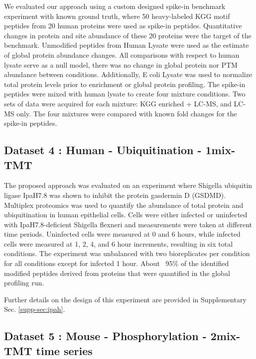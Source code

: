 \documentclass[mcp]{article}
\numberwithin{figure}{section} %
\numberwithin{table}{section}
\begin{document}
We evaluated our approach using a custom designed spike-in benchmark experiment with known ground truth, where 50 heavy-labeled KGG motif peptides from 20 human proteins were used as spike-in peptides. Quantitative changes in protein and site abundance of these 20 proteins were the target of the benchmark.  Unmodified peptides from Human Lysate were used as the estimate of global protein abundance changes. All comparisons with respect to human lysate serve as a null model, there was no change in global protein nor PTM abundance between conditions. Additionally, E coli Lysate was used to normalize total protein levels prior to enrichment or global protein profiling. The spike-in peptides were mixed with human lysate to create four mixture conditions. Two sets of data were acquired for each mixture: KGG enriched + LC-MS, and LC-MS only. The four mixtures were compared with known fold changes for the spike-in peptides.

\subsection*{Dataset 4 : Human - Ubiquitination - 1mix-TMT}

The proposed approach was evaluated on an experiment where Shigella ubiquitin ligase IpaH7.8 was shown to inhibit the protein gasdermin D (GSDMD)\cite{LUCHETTI2021}. Multiplex proteomics was used to quantify the abundance of total protein and ubiquitination in human epithelial cells. Cells were either infected or uninfected with IpaH7.8-deficient Shigella flexneri and measurements were taken at different time periods. Uninfected cells were measured at 0 and 6 hours, while infected cells were measured at 1, 2, 4, and 6 hour increments, resulting in six total conditions. The experiment was unbalanced with two bioreplicates per condition for all conditions except for infected 1 hour. About ~95\% of the identified modified peptides derived from proteins that were quantified in the global profiling run.

Further details on the design of this experiment are provided in Supplementary Sec. \ref{supp-sec:ipah}. 

\subsection*{Dataset 5 : Mouse - Phosphorylation - 2mix-TMT time series}
\end{document}
